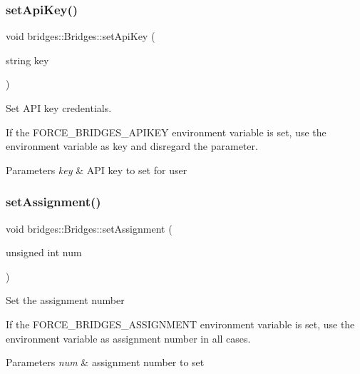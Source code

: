 \subsubsection{\texorpdfstring{set\+Api\+Key()}{setApiKey()}}
{\footnotesize\ttfamily void bridges\+::\+Bridges\+::set\+Api\+Key (\begin{DoxyParamCaption}\item[{string}]{key }\end{DoxyParamCaption})\hspace{0.3cm}{\ttfamily [inline]}}



Set A\+PI key credentials. 

If the F\+O\+R\+C\+E\+\_\+\+B\+R\+I\+D\+G\+E\+S\+\_\+\+A\+P\+I\+K\+EY environment variable is set, use the environment variable as key and disregard the parameter.


\begin{DoxyParams}{Parameters}
{\em key} & A\+PI key to set for user \\
\hline
\end{DoxyParams}
\mbox{\label{classbridges_1_1_bridges_aca7a68fb8cc0d1bec81656dfa77b1162}} 
\subsubsection{\texorpdfstring{set\+Assignment()}{setAssignment()}}
{\footnotesize\ttfamily void bridges\+::\+Bridges\+::set\+Assignment (\begin{DoxyParamCaption}\item[{unsigned int}]{num }\end{DoxyParamCaption})\hspace{0.3cm}{\ttfamily [inline]}}

Set the assignment number

If the F\+O\+R\+C\+E\+\_\+\+B\+R\+I\+D\+G\+E\+S\+\_\+\+A\+S\+S\+I\+G\+N\+M\+E\+NT environment variable is set, use the environment variable as assignment number in all cases.


\begin{DoxyParams}{Parameters}
{\em num} & assignment number to set \\
\hline
\end{DoxyParams}
\mbox{\label{classbridges_1_1_bridges_ad00c07d3a028110424909081a94c4013}} 
